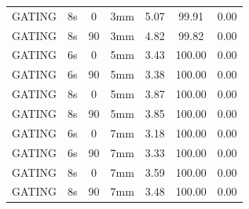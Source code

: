 \documentclass[type=dr, dr=rernat, accentcolor=tud7b,colorbacktitle, bigchapter, openright, twoside, 12pt ]{tudthesis}
\begin{document}
\begin{table}[H]
\begin{tabular}{|c||c|c|c||c|c|c|}
GATING & 8s & 0 & 3mm & 5.07 & 99.91 & 0.00 \\
GATING & 8s & 90 & 3mm & 4.82 & 99.82 & 0.00 \\
GATING & 6s & 0 & 5mm & 3.43 & 100.00 & 0.00 \\
GATING & 6s & 90 & 5mm & 3.38 & 100.00 & 0.00 \\
GATING & 8s & 0 & 5mm & 3.87 & 100.00 & 0.00 \\
GATING & 8s & 90 & 5mm & 3.85 & 100.00 & 0.00 \\
GATING & 6s & 0 & 7mm & 3.18 & 100.00 & 0.00 \\
GATING & 6s & 90 & 7mm & 3.33 & 100.00 & 0.00 \\
GATING & 8s & 0 & 7mm & 3.59 & 100.00 & 0.00 \\
GATING & 8s & 90 & 7mm & 3.48 & 100.00 & 0.00 \\
    \hline\hline 
  \end{tabular}
\end{table}

\newpage
\end{document}
